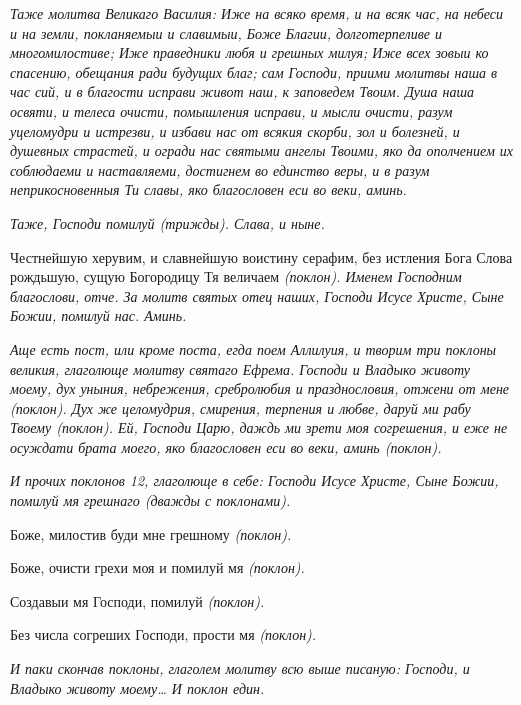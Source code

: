  \itshape Таже молитва Великаго Василия:\normalfont{} Иже на всяко время, и на всяк час, на
небеси и на земли, покланяемыи и славимыи, Боже Благии, долготерпеливе и
многомилостиве; Иже праведники любя и грешных милуя; Иже всех зовыи
ко спасению, обещания ради будущих благ; сам Господи, приими молитвы
наша в час сий, и в благости исправи живот наш, к заповедем Твоим. Душа
наша освяти, и телеса очисти, помышления исправи, и мысли очисти, разум
уцеломудри и истрезви, и избави нас от всякия скорби, зол и болезней, и
душевных страстей, и огради нас святыми ангелы Твоими, яко да
ополчением их соблюдаеми и наставляеми, достигнем во единство веры, и в
разум неприкосновенныя Ти славы, яко благословен еси во веки,
аминь.


 \itshape Таже,\normalfont{} Господи помилуй \itshape (трижды)\normalfont{}. \itshape Слава, и ныне\normalfont{}.


   Честнейшую херувим, и славнейшую воистину серафим, без истления
Бога Слова рождьшую, сущую Богородицу Тя величаем \itshape (поклон)\normalfont{}. Именем
Господним благослови, отче. За молитв святых отец наших, Господи Исусе
Христе, Сыне Божии, помилуй нас. Аминь.


 \itshape Аще есть пост, или кроме поста, егда поем Аллилуия, и творим три
поклоны великия, глаголюще молитву святаго Ефрема\normalfont{}. Господи и Владыко
животу моему, дух уныния, небрежения, сребролюбия и празднословия,
отжени от мене \itshape (поклон)\normalfont{}. Дух же целомудрия, смирения, терпения и любве,
даруй ми рабу Твоему \itshape (поклон)\normalfont{}. Ей, Господи Царю, даждь ми зрети моя
согрешения, и еже не осуждати брата моего, яко благословен еси во веки,
аминь \itshape (поклон)\normalfont{}.


 \itshape И прочих поклонов 12, глаголюще в себе:\normalfont{} Господи Исусе Христе, Сыне
Божии, помилуй мя грешнаго \itshape (дважды с поклонами)\normalfont{}.


   Боже, милостив буди мне грешному \itshape (поклон)\normalfont{}.


   Боже, очисти грехи моя и помилуй мя \itshape (поклон)\normalfont{}.


   Создавыи мя Господи, помилуй \itshape (поклон)\normalfont{}.


   Без числа согреших Господи, прости мя \itshape (поклон)\normalfont{}.


 \itshape И паки скончав поклоны, глаголем молитву всю выше писаную:\normalfont{} Господи,
и Владыко животу моему… \itshape И поклон един. \normalfont{}


